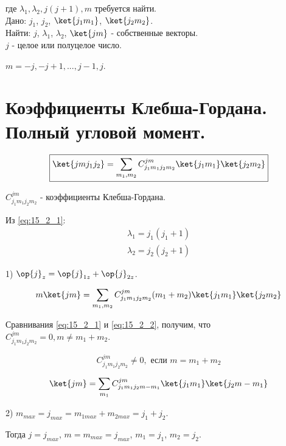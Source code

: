 где $\lambda_1, \lambda_2, j(j+1), m$ требуется найти.\\

Дано: $j_1$, $j_2$, $\ket{j_1 m_1}$, $\ket{j_2 m_2}$. \\

Найти: $j$, $\lambda_1$, $\lambda_2$, $\ket{j m}$ - собственные векторы. \\

$j$ - целое или полуцелое число.

$m = -j, -j + 1, ..., j - 1, j$.

\begin{sloppypar}
\section{Коэффициенты Клебша-Гордана. Полный угловой момент.}
\end{sloppypar}

\begin{equation}
\label{eq:15_2_1}
\boxed{\ket{j m j_1 j_2} = \sum_{m_1, m_2} C^{j m}_{j_1 m_1 j_2 m_2} \ket{j_1 m_1}\ket{j_2 m_2}}
\end{equation}

$C^{j m}_{j_1 m_1 j_2 m_2}$ - коэффициенты Клебша-Гордана.

Из \eqref{eq:15_2_1}:
\begin{gather*}
\lambda_1 = j_1(j_1 + 1) \\
\lambda_2 = j_2(j_2 + 1)
\end{gather*}

1) $\op{j}_z = \op{j}_{1z} + \op{j}_{2z}$.

\begin{equation}
\label{eq:15_2_2}
m\ket{j m} = \sum_{m_1, m_2} C^{j m}_{j_1 m_1 j_2 m_2} (m_1 + m_2)\ket{j_1 m_1}\ket{j_2 m_2}
\end{equation}

Сравнивания \eqref{eq:15_2_1} и \eqref{eq:15_2_2}, получим, что $C^{j m}_{j_1 m_1 j_2 m_2} = 0, m \not = m_1 + m_2$.

$$
\boxed{C^{j m}_{j_1 m_1 j_2 m_2} \not = 0, \text{~если~} m = m_1 + m_2}
$$

\begin{equation}
\label{eq:15_2_3}
\ket{j m} = \sum_{m_1} C^{j m}_{j_1 m_1 j_2 m - m_1} \ket{j_1 m_1}\ket{j_2 m - m_1}
\end{equation}

2) $m_{max} = j_{max} = m_{1max}+m_{2max} = j_1 + j_2$.

Тогда $j = j_{max}$, $m = m_{max} = j_{max}$, $m_1 = j_1$, $m_2 = j_2$.

